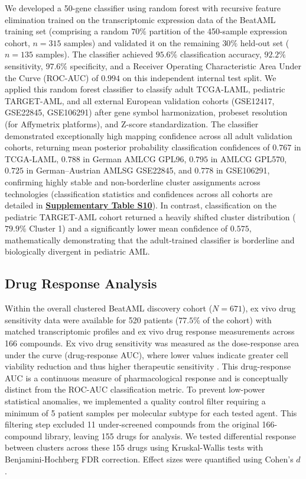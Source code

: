 \documentclass[11pt,a4paper]{article}
\begin{document}
We developed a 50-gene classifier using random forest with recursive feature elimination trained on the transcriptomic expression data of the BeatAML training set (comprising a random $70\%$ partition of the 450-sample expression cohort, $n=315$ samples) and validated it on the remaining $30\%$ held-out set ($n=135$ samples). The classifier achieved $95.6\%$ classification accuracy, $92.2\%$ sensitivity, $97.6\%$ specificity, and a Receiver Operating Characteristic Area Under the Curve (ROC-AUC) of $0.994$ on this independent internal test split. We applied this random forest classifier to classify adult TCGA-LAML, pediatric TARGET-AML, and all external European validation cohorts (GSE12417, GSE22845, GSE106291) after gene symbol harmonization, probeset resolution (for Affymetrix platforms), and Z-score standardization. The classifier demonstrated exceptionally high mapping confidence across all adult validation cohorts, returning mean posterior probability classification confidences of $0.767$ in TCGA-LAML, $0.788$ in German AMLCG GPL96, $0.795$ in AMLCG GPL570, $0.725$ in German--Austrian AMLSG GSE22845, and $0.778$ in GSE106291, confirming highly stable and non-borderline cluster assignments across technologies (classification statistics and confidences across all cohorts are detailed in \href{Supplementary_Methods.pdf#tab:tabS10}{\textbf{Supplementary Table S10}}). In contrast, classification on the pediatric TARGET-AML cohort returned a heavily shifted cluster distribution ($79.9\%$ Cluster 1) and a significantly lower mean confidence of $0.575$, mathematically demonstrating that the adult-trained classifier is borderline and biologically divergent in pediatric AML.\subsection{Drug Response Analysis}

Within the overall clustered BeatAML discovery cohort ($N=671$), ex vivo drug sensitivity data were available for 520 patients ($77.5\%$ of the cohort) with matched transcriptomic profiles and ex vivo drug response measurements across 166 compounds. Ex vivo drug sensitivity was measured as the dose-response area under the curve (drug-response AUC), where lower values indicate greater cell viability reduction and thus higher therapeutic sensitivity \cite{tyner2018beataml}. This drug-response AUC is a continuous measure of pharmacological response and is conceptually distinct from the ROC-AUC classification metric. To prevent low-power statistical anomalies, we implemented a quality control filter requiring a minimum of 5 patient samples per molecular subtype for each tested agent. This filtering step excluded 11 under-screened compounds from the original 166-compound library, leaving 155 drugs for analysis. We tested differential response between clusters across these 155 drugs using Kruskal-Wallis tests with Benjamini-Hochberg FDR correction. Effect sizes were quantified using Cohen's $d$.
\end{document}
